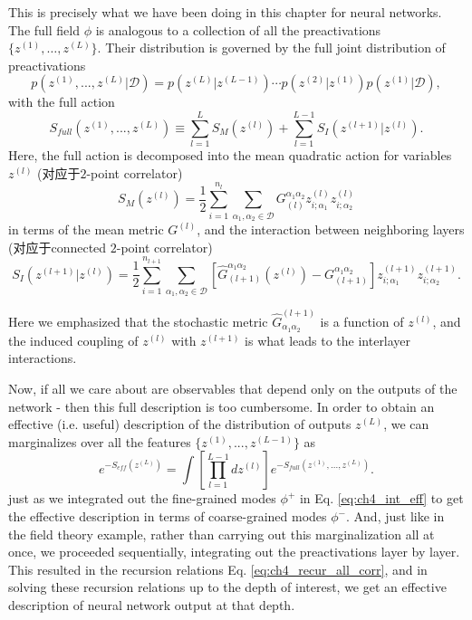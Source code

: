 This is precisely what we have been doing in this chapter for neural networks. 
The full field $\phi$ is analogous to a collection of all the preactivations 
$\{z^{(1)},…,z^{(L)}\}$.  Their distribution is governed by the full joint 
distribution of preactivations 
\begin{equation}
    p\left(z^{(1)},...,z^{(L)}\big| \mathcal{D}\right) = p\left(z^{(L)}\big| z^{(L-1)}\right)
    \cdots p\left(z^{(2)}\big|z^{(1)}\right)p\left(z^{(1)}\big| \mathcal{D}\right),
\end{equation}
with the full action
\begin{equation}
    S_{full}\left(z^{(1)},...,z^{(L)}\right) \equiv \sum_{l=1}^L S_M\left(z^{(l)}\right)
    + \sum_{l=1}^{L-1}S_I\left(z^{(l+1)}\big| z^{(l)}\right).
\end{equation}
Here, the full action is decomposed into the mean quadratic action for variables $z^{(l)}$
(对应于$2$-point correlator)
\begin{equation}
    S_M\left(z^{(l)}\right) = \frac{1}{2}\sum_{i=1}^{n_l}\sum_{\alpha_1,\alpha_2\in\mathcal{D}}
    G_{(l)}^{\alpha_1\alpha_2}z_{i;\alpha_1}^{(l)}z_{i;\alpha_2}^{(l)}
\end{equation}
in terms of the mean metric $G^{(l)}$, and the interaction between neighboring layers
(对应于connected $2$-point correlator)
\begin{equation}
    S_I\left(z^{(l+1)}\big| z^{(l)}\right)=\frac{1}{2}\sum_{i=1}^{n_{l+1}}
    \sum_{\alpha_1,\alpha_2\in\mathcal{D}}\left[
    \hat{G}_{(l+1)}^{\alpha_1\alpha_2}\left(z^{(l)}\right) - G_{(l+1)}^{\alpha_1\alpha_2}\right]
    z_{i;\alpha_1}^{(l+1)} z_{i;\alpha_2}^{(l+1)}.
 \end{equation}

 Here we emphasized that the stochastic metric $\hat{G}_{\alpha_1\alpha_2}^{(l+1)}$ 
 is a function of $z^{(l)}$, and the induced coupling of $z^{(l)}$ with $z^{(l+1)}$ 
 is what leads to the interlayer interactions.

Now, if all we care about are observables that depend only on the outputs of the network
- then this full description 
is too cumbersome. In order to obtain an effective (i.e. useful) description of 
the distribution of outputs $z^{(L)}$, we can marginalizes over all the features 
$\{z^{(1)},...,z^{(L-1)}\}$ as
\begin{equation}
    e^{-S_{eff}\left(z^{(L)}\right)} = \int \left[\prod_{l=1}^{L-1}dz^{(l)}\right]
    e^{-S_{full}\left(z^{(1)},...,z^{(L)}\right)}.
\end{equation}
just as we integrated out the fine-grained modes $\phi^+$ in Eq. \ref{eq:ch4_int_eff} to 
get the effective description in terms of coarse-grained modes $\phi^−$. 
And, just like in the field theory example, rather than carrying out this 
marginalization all at once, we proceeded sequentially, integrating out 
the preactivations layer by layer. This resulted in the recursion relations 
Eq. \ref{eq:ch4_recur_all_corr}, and in solving these recursion relations 
up to the depth of interest, we get an effective description of 
neural network output at that depth. 

